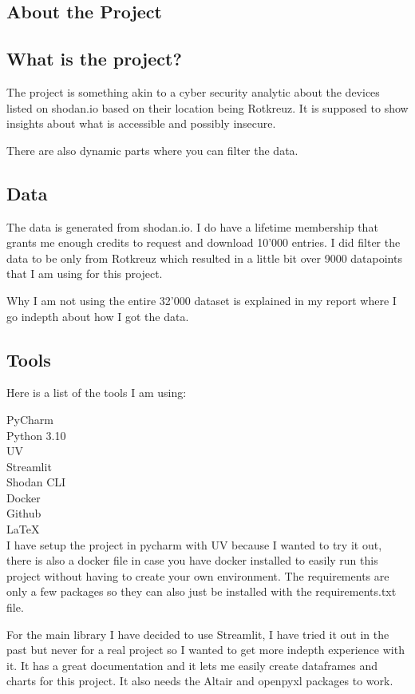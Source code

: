 \documentclass[11pt,a4paper]{article}
\begin{document}
\begin{about}
\section{About the Project}
\subsection{What is the project?}
The project is something akin to a cyber security analytic about the devices listed on shodan.io based on their location
being Rotkreuz. It is supposed to show insights about what is accessible and possibly insecure.

There are also dynamic parts where you can filter the data.
\subsection{Data}
The data is generated from shodan.io. I do have a lifetime membership that grants me enough credits to request and
download 10'000 entries. I did filter the data to be only from Rotkreuz which resulted in a little bit over 9000
datapoints that I am using for this project.

Why I am not using the entire 32'000 dataset is explained in my report where I go indepth about how I got the data.

\subsection{Tools}
Here is a list of the tools I am using:

PyCharm \\
Python 3.10 \\
UV \\
Streamlit \\
Shodan CLI \\
Docker \\
Github \\
LaTeX \\

I have setup the project in pycharm with UV because I wanted to try it out, there is also a docker file in case you have
docker installed to easily run this project without having to create your own environment. The requirements are only a few
packages so they can also just be installed with the requirements.txt file.

For the main library I have decided to use Streamlit, I have tried it out in the past but never for a real project so I
wanted to get more indepth experience with it. It has a great documentation and it lets me easily create dataframes and
charts for this project. It also needs the Altair and openpyxl packages to work.


\end{about}
\end{document}
